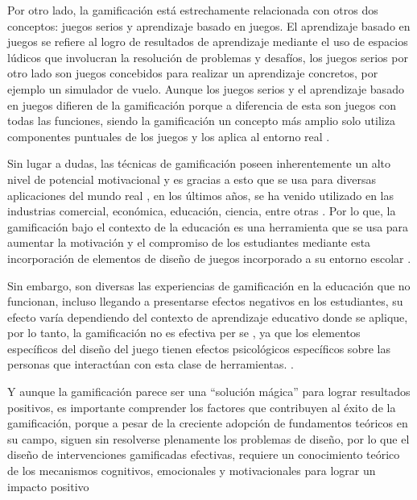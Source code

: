 Por otro lado, la gamificación está estrechamente relacionada con otros dos conceptos: juegos serios y 
aprendizaje basado en juegos. El aprendizaje basado en juegos se refiere al logro de resultados de aprendizaje
mediante el uso de espacios lúdicos que involucran la resolución de problemas y desafíos, los juegos serios
por otro lado son juegos concebidos para realizar un aprendizaje concretos, por ejemplo un simulador de vuelo.
Aunque los juegos serios y el aprendizaje basado en juegos difieren de la gamificación porque a diferencia de
esta son juegos con todas las funciones, siendo la gamificación un concepto más amplio solo utiliza 
componentes puntuales de los juegos y los aplica al entorno real \cite{KRATH2021106963}.

Sin lugar a dudas, las técnicas de gamificación poseen inherentemente un alto nivel de potencial motivacional
y es gracias a esto que se usa para diversas aplicaciones del mundo real \cite{SAILER2017371}, en los últimos 
años, se ha venido utilizado en las industrias comercial, económica, educación, ciencia, entre otras 
\cite{XU2017}. Por lo que, la gamificación bajo el contexto de la educación es una herramienta que se usa para
aumentar la motivación y el compromiso de los estudiantes mediante esta incorporación de elementos de diseño de 
juegos incorporado a su entorno escolar \cite{Li2020}.

Sin embargo, son diversas las experiencias de gamificación en la educación que no funcionan, incluso llegando
a presentarse efectos negativos en los estudiantes, su efecto varía dependiendo del contexto de
aprendizaje educativo donde se aplique, por lo tanto, la gamificación no es efectiva per se 
\cite{KRATH2021106963}, ya que los elementos específicos del diseño del juego tienen efectos psicológicos 
específicos sobre las personas que interactúan con esta clase de herramientas. \cite{SAILER2017371}.

Y aunque la gamificación parece ser una ``solución mágica'' para lograr resultados positivos, es importante
comprender los factores que contribuyen al éxito de la gamificación, porque a pesar de la creciente adopción
de fundamentos teóricos en su campo, siguen sin resolverse plenamente los problemas de diseño, por lo que el
diseño de intervenciones gamificadas efectivas, requiere un conocimiento teórico de los mecanismos cognitivos,
emocionales y motivacionales para lograr un impacto positivo \cite{KRATH2021106963}

